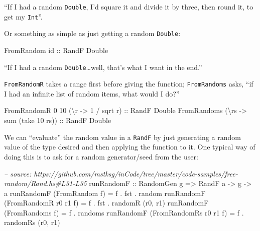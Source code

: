 \documentclass[]{article}
\newenvironment{Shaded}{}{}
\newcommand{\CommentTok}[1]{\textcolor[rgb]{0.38,0.63,0.69}{\textit{#1}}}
\newcommand{\DataTypeTok}[1]{\textcolor[rgb]{0.56,0.13,0.00}{#1}}
\newcommand{\DecValTok}[1]{\textcolor[rgb]{0.25,0.63,0.44}{#1}}
\newcommand{\FunctionTok}[1]{\textcolor[rgb]{0.02,0.16,0.49}{#1}}
\newcommand{\NormalTok}[1]{#1}
\newcommand{\OtherTok}[1]{\textcolor[rgb]{0.00,0.44,0.13}{#1}}
\begin{document}
``If I had a random \texttt{Double}, I'd square it and divide it by three, then
round it, to get my \texttt{Int}''.

Or something as simple as just getting a random \texttt{Double}:

\begin{Shaded}
\begin{Highlighting}[]
\DataTypeTok{FromRandom}\OtherTok{ id ::} \DataTypeTok{RandF} \DataTypeTok{Double}
\end{Highlighting}
\end{Shaded}

``If I had a random \texttt{Double}\ldots{}well, that's what I want in the
end.''

\texttt{FromRandomR} takes a range first before giving the function;
\texttt{FromRandoms} asks, ``if I had an infinite list of random items, what
would I do?''

\begin{Shaded}
\begin{Highlighting}[]
\DataTypeTok{FromRandomR} \DecValTok{0} \DecValTok{10}\NormalTok{ (\textbackslash{}r }\OtherTok{->} \DecValTok{1} \FunctionTok{/}\NormalTok{ sqrt r)}\OtherTok{ ::} \DataTypeTok{RandF} \DataTypeTok{Double}
\DataTypeTok{FromRandoms}\NormalTok{ (\textbackslash{}rs }\OtherTok{->}\NormalTok{ sum (take }\DecValTok{10}\NormalTok{ rs))}\OtherTok{ ::} \DataTypeTok{RandF} \DataTypeTok{Double}
\end{Highlighting}
\end{Shaded}

We can ``evaluate'' the random value in a \texttt{RandF} by just generating a
random value of the type desired and then applying the function to it. One
typical way of doing this is to ask for a random generator/seed from the user:

\begin{Shaded}
\begin{Highlighting}[]
\CommentTok{-- source: https://github.com/mstksg/inCode/tree/master/code-samples/free-random/Rand.hs#L31-L35}
\OtherTok{runRandomF ::} \DataTypeTok{RandomGen}\NormalTok{ g }\OtherTok{=>} \DataTypeTok{RandF}\NormalTok{ a }\OtherTok{->}\NormalTok{ g }\OtherTok{->}\NormalTok{ a}
\NormalTok{runRandomF (}\DataTypeTok{FromRandom}\NormalTok{ f)         }\FunctionTok{=}\NormalTok{ f }\FunctionTok{.}\NormalTok{ fst }\FunctionTok{.}\NormalTok{ random}
\NormalTok{runRandomF (}\DataTypeTok{FromRandomR}\NormalTok{ r0 r1 f)  }\FunctionTok{=}\NormalTok{ f }\FunctionTok{.}\NormalTok{ fst }\FunctionTok{.}\NormalTok{ randomR (r0, r1)}
\NormalTok{runRandomF (}\DataTypeTok{FromRandoms}\NormalTok{ f)        }\FunctionTok{=}\NormalTok{ f }\FunctionTok{.}\NormalTok{ randoms}
\NormalTok{runRandomF (}\DataTypeTok{FromRandomRs}\NormalTok{ r0 r1 f) }\FunctionTok{=}\NormalTok{ f }\FunctionTok{.}\NormalTok{ randomRs (r0, r1)}
\end{Highlighting}
\end{Shaded}
\end{document}

